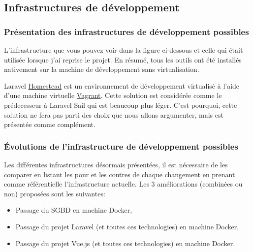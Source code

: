 \documentclass[
    iai, %
    il, %
]{heig-tb}
\begin{document}
\subsection{Infrastructures de développement}

\subsubsection{Présentation des infrastructures de développement possibles}
L'infrastructure que vous pouvez voir dans la figure ci-dessous et celle qui était utilisée lorsque j'ai reprise le projet.
En résumé, tous les outils ont été installés nativement sur la machine de développement sans virtualisation.



Laravel \href{https://laravel.com/docs/9.x/homestead}{Homestead} est un environnement de développement virtualisé à l'aide d'une machine virtuelle \href{https://www.vagrantup.com/}{Vagrant}.
Cette solution est considérée comme le prédecesseur à Laravel Sail qui est beaucoup plus léger.
C'est pourquoi, cette solution ne fera pas parti des choix que nous allons argumenter, mais est présentée comme complément.



\clearpage

\subsubsection{Évolutions de l'infrastructure de développement possibles}
Les différentes infrastructures désormais présentées, il est nécessaire de les comparer en listant les pour et les contres de chaque changement en prenant comme référentielle l'infrastructure actuelle.
Les 3 améliorations (combinées ou non) proposées sont les suivantes:
\begin{itemize}
    \item Passage du SGBD en machine Docker,
    \item Passage du projet Laravel (et toutes ces technologies) en machine Docker,
    \item Passage du projet Vue.js (et toutes ces technologies) en machine Docker.
\end{itemize}
\end{document}
